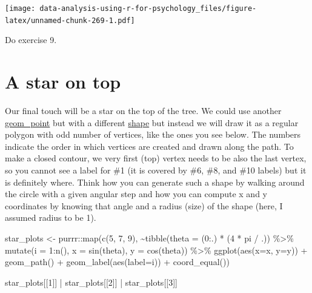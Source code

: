 \documentclass[
]{book}
\newenvironment{Shaded}{\begin{snugshade}}{\end{snugshade}}
\newcommand{\AttributeTok}[1]{\textcolor[rgb]{0.77,0.63,0.00}{#1}}
\newcommand{\DecValTok}[1]{\textcolor[rgb]{0.00,0.00,0.81}{#1}}
\newcommand{\FunctionTok}[1]{\textcolor[rgb]{0.00,0.00,0.00}{#1}}
\newcommand{\NormalTok}[1]{#1}
\newcommand{\OtherTok}[1]{\textcolor[rgb]{0.56,0.35,0.01}{#1}}
\newcommand{\SpecialCharTok}[1]{\textcolor[rgb]{0.00,0.00,0.00}{#1}}
\begin{document}
\texttt{[image: data-analysis-using-r-for-psychology\_files/figure-latex/unnamed-chunk-269-1.pdf]}

Do exercise 9.

\hypertarget{a-star-on-top}{%
\section{A star on top}\label{a-star-on-top}}

Our final touch will be a star on the top of the tree. We could use another \href{https://ggplot2.tidyverse.org/reference/geom_point.html}{geom\_point} but with a different \href{https://ggplot2.tidyverse.org/articles/ggplot2-specs.html\#sec:shape-spec}{shape} but instead we will draw it as a regular polygon with odd number of vertices, like the ones you see below. The numbers indicate the order in which vertices are created and drawn along the path. To make a closed contour, we very first (top) vertex needs to be also the last vertex, so you cannot see a label for \#1 (it is covered by \#6, \#8, and \#10 labels) but it is definitely where. Think how you can generate such a shape by walking around the circle with a given angular step and how you can compute x and y coordinates by knowing that angle and a radius (size) of the shape (here, I assumed radius to be 1).

\begin{Shaded}
\begin{Highlighting}[]
\NormalTok{star\_plots }\OtherTok{\textless{}{-}}\NormalTok{ purrr}\SpecialCharTok{::}\FunctionTok{map}\NormalTok{(}\FunctionTok{c}\NormalTok{(}\DecValTok{5}\NormalTok{, }\DecValTok{7}\NormalTok{, }\DecValTok{9}\NormalTok{),}
                         \SpecialCharTok{\textasciitilde{}}\FunctionTok{tibble}\NormalTok{(}\AttributeTok{theta =}\NormalTok{ (}\DecValTok{0}\SpecialCharTok{:}\NormalTok{.) }\SpecialCharTok{*}\NormalTok{ (}\DecValTok{4} \SpecialCharTok{*}\NormalTok{ pi }\SpecialCharTok{/}\NormalTok{ .)) }\SpecialCharTok{\%\textgreater{}\%}
                          \FunctionTok{mutate}\NormalTok{(}\AttributeTok{i =} \DecValTok{1}\SpecialCharTok{:}\FunctionTok{n}\NormalTok{(),}
                                 \AttributeTok{x =} \FunctionTok{sin}\NormalTok{(theta),}
                                 \AttributeTok{y =} \FunctionTok{cos}\NormalTok{(theta)) }\SpecialCharTok{\%\textgreater{}\%}
                          \FunctionTok{ggplot}\NormalTok{(}\FunctionTok{aes}\NormalTok{(}\AttributeTok{x=}\NormalTok{x, }\AttributeTok{y=}\NormalTok{y)) }\SpecialCharTok{+} 
                          \FunctionTok{geom\_path}\NormalTok{() }\SpecialCharTok{+}
                          \FunctionTok{geom\_label}\NormalTok{(}\FunctionTok{aes}\NormalTok{(}\AttributeTok{label=}\NormalTok{i)) }\SpecialCharTok{+}
                          \FunctionTok{coord\_equal}\NormalTok{())}

                      
\NormalTok{star\_plots[[}\DecValTok{1}\NormalTok{]] }\SpecialCharTok{|}\NormalTok{ star\_plots[[}\DecValTok{2}\NormalTok{]] }\SpecialCharTok{|}\NormalTok{ star\_plots[[}\DecValTok{3}\NormalTok{]]}
\end{Highlighting}
\end{Shaded}
\end{document}
